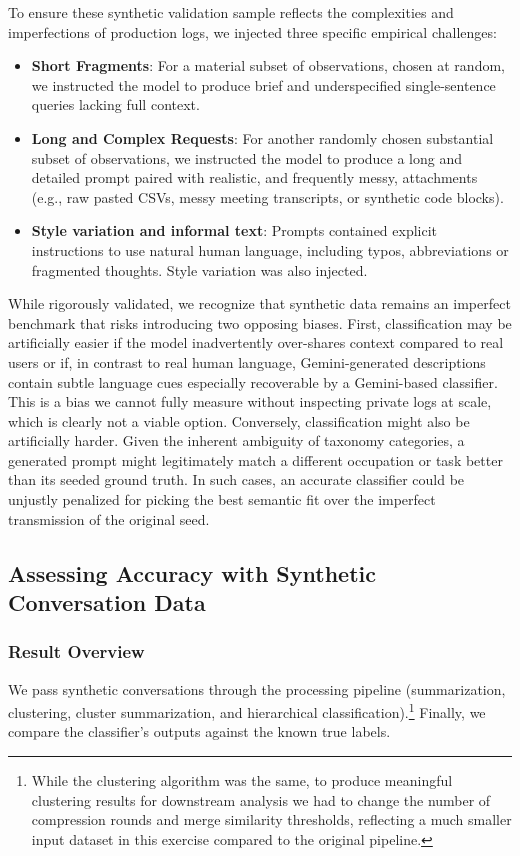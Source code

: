 \documentclass[11pt,a4paper]{article}
\begin{document}
To ensure these synthetic validation sample reflects the complexities and imperfections of production logs, we injected three specific empirical challenges:
\begin{itemize}
    \item \textbf{Short Fragments}: For a material subset of observations, chosen at random, we instructed the model to produce brief and underspecified single-sentence queries lacking full context. 
    \item \textbf{Long and Complex Requests}: For another randomly chosen substantial subset of observations, we instructed the model to produce a long and detailed prompt paired with realistic, and frequently messy, attachments (e.g., raw pasted CSVs, messy meeting transcripts, or synthetic code blocks).
    \item \textbf{Style variation and informal text}: Prompts contained explicit instructions to use natural human language, including typos, abbreviations or fragmented thoughts. Style variation was also injected.
\end{itemize}

While rigorously validated, we recognize that synthetic data remains an imperfect benchmark that risks introducing two opposing biases. First, classification may be artificially easier if the model inadvertently over-shares context compared to real users or if, in contrast to real human language, Gemini-generated descriptions contain subtle language cues especially recoverable by a Gemini-based classifier. This is a bias we cannot fully measure without inspecting private logs at scale, which is clearly not a viable option. Conversely, classification might also be artificially harder. Given the inherent ambiguity of taxonomy categories, a generated prompt might legitimately match a different occupation or task better than its seeded ground truth. In such cases, an accurate classifier could be unjustly penalized for picking the best semantic fit over the imperfect transmission of the original seed.

\subsection{Assessing Accuracy with Synthetic Conversation Data}
\subsubsection{Result Overview}
We pass synthetic conversations through the processing pipeline (summarization, clustering, cluster summarization, and hierarchical classification).\footnote{While the clustering algorithm was the same, to produce meaningful clustering results for downstream analysis we had to change the number of compression rounds and merge similarity thresholds, reflecting a much smaller input dataset in this exercise compared to the original pipeline.} Finally, we compare the classifier's outputs against the known true labels.
\end{document}

